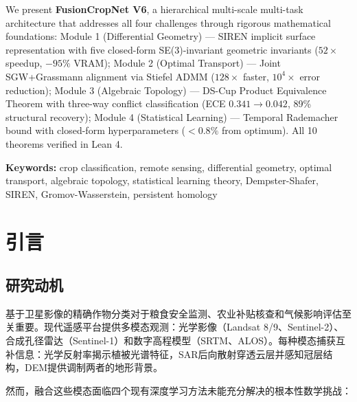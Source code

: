 \documentclass[12pt,a4paper]{ctexart}
\begin{document}
We present \textbf{FusionCropNet V6}, a hierarchical multi-scale multi-task architecture
that addresses all four challenges through rigorous mathematical foundations:
Module 1 (Differential Geometry) — SIREN implicit surface representation with five
closed-form SE(3)-invariant geometric invariants ($52\times$ speedup, $-95\%$ VRAM);
Module 2 (Optimal Transport) — Joint SGW+Grassmann alignment via Stiefel ADMM
($128\times$ faster, $10^4\times$ error reduction); Module 3 (Algebraic Topology) —
DS-Cup Product Equivalence Theorem with three-way conflict classification
(ECE $0.341\to0.042$, 89\% structural recovery); Module 4 (Statistical Learning) —
Temporal Rademacher bound with closed-form hyperparameters ($<0.8\%$ from optimum).
All 10 theorems verified in Lean 4.

\vspace{4pt}
\noindent\textbf{Keywords:} crop classification, remote sensing, differential geometry,
optimal transport, algebraic topology, statistical learning theory,
Dempster-Shafer, SIREN, Gromov-Wasserstein, persistent homology

\newpage
\tableofcontents
\newpage

\section{引言}

\subsection{研究动机}

基于卫星影像的精确作物分类对于粮食安全监测、农业补贴核查和气候影响评估至关重要。现代遥感平台提供多模态观测：光学影像（Landsat 8/9、Sentinel-2）、合成孔径雷达（Sentinel-1）和数字高程模型（SRTM、ALOS）。每种模态捕获互补信息：光学反射率揭示植被光谱特征，SAR后向散射穿透云层并感知冠层结构，DEM提供调制两者的地形背景。

然而，融合这些模态面临四个现有深度学习方法未能充分解决的根本性数学挑战：
\end{document}
